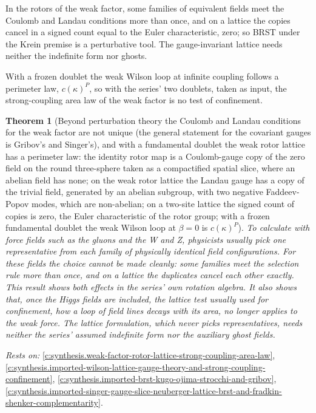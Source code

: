 \documentclass[11pt]{article}
\newtheorem{theorem}{Theorem}[section]
\theoremstyle{definition}
\theoremstyle{plain}
\begin{document}
In the rotors of the weak factor, some families of equivalent fields meet the Coulomb and Landau conditions more than once, and on a lattice the copies cancel in a signed count equal to the Euler characteristic, zero; so BRST under the Krein premise is a perturbative tool. The gauge-invariant lattice needs neither the indefinite form nor ghosts.

With a frozen doublet the weak Wilson loop at infinite coupling follows a perimeter law, $c(\kappa)^{P}$, so with the series' two doublets, taken as input, the strong-coupling area law of the weak factor is no test of confinement.

\begin{theorem}[Beyond perturbation theory the Coulomb and Landau conditions for the weak factor are not unique (the general statement for the covariant gauges is Gribov's and Singer's), and with a fundamental doublet the weak rotor lattice has a perimeter law: the identity rotor map is a Coulomb-gauge copy of the zero field on the round three-sphere taken as a compactified spatial slice, where an abelian field has none; on the weak rotor lattice the Landau gauge has a copy of the trivial field, generated by an abelian subgroup, with two negative Faddeev-Popov modes, which are non-abelian; on a two-site lattice the signed count of copies is zero, the Euler characteristic of the rotor group; with a frozen fundamental doublet the weak Wilson loop at $\beta = 0$ is $c(\kappa)^{P}$]\label{c:synthesis.non-abelian-gauge-fixing-has-gribov-copies-and-the-weak-rotor-lattice-with-doublets-has-a-perimeter-law}
To calculate with force fields such as the gluons and the W and Z, physicists usually pick one representative from each family of physically identical field configurations. For these fields the choice cannot be made cleanly: some families meet the selection rule more than once, and on a lattice the duplicates cancel each other exactly. This result shows both effects in the series' own rotation algebra. It also shows that, once the Higgs fields are included, the lattice test usually used for confinement, how a loop of field lines decays with its area, no longer applies to the weak force. The lattice formulation, which never picks representatives, needs neither the series' assumed indefinite form nor the auxiliary ghost fields.
\end{theorem}
\noindent\emph{Rests on:} \ref{c:synthesis.weak-factor-rotor-lattice-strong-coupling-area-law}, \ref{c:synthesis.imported-wilson-lattice-gauge-theory-and-strong-coupling-confinement}, \ref{c:synthesis.imported-brst-kugo-ojima-strocchi-and-gribov}, \ref{c:synthesis.imported-singer-gauge-slice-neuberger-lattice-brst-and-fradkin-shenker-complementarity}.
\end{document}
